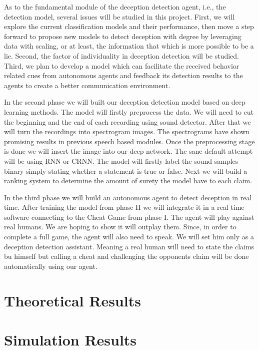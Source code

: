As to the fundamental module of the deception detection agent, i.e., the detection model, several issues will be studied in this project. First, we will explore the current classification models and their performance, then move a step forward to propose new models to detect deception with degree by leveraging data with scaling, or at least, the information that which is more possible to be a lie. Second, the factor of individuality in deception detection will be studied. Third, we plan to develop a model which can facilitate the received behavior related cues from autonomous agents and feedback its detection results to the agents to create a better communication environment. 

In the second phase we will built our deception detection model based on deep learning methods. The model will firstly preprocess the data. We will need to cut the beginning and the end of each recording using sound detector. After that we will turn the recordings into spectrogram images. The spectrograms have shown promising results in previous speech based modules. Once the preprocessing stage is done we will insert the image into our deep network. The sane default attempt will be using RNN or CRNN. The model will firstly label the sound samples binary simply stating whether a statement is true or false. Next we will build a ranking system to determine the amount of surety the model have to each claim. 

In the third phase we will build an autonomous agent to detect deception in real time. After training the model from phase II we will integrate it in a real time software connecting to the Cheat Game from phase I. The agent will play against real humans. We are hoping to show it will outplay them. Since, in order to complete a full game, the agent will also need to speak. We will set him only as a deception detection assistant. Meaning a real human will need to state the claims bu himself but calling a cheat and challenging the opponents claim will be done automatically using our agent.  


\section {Theoretical Results}


\section {Simulation Results}
